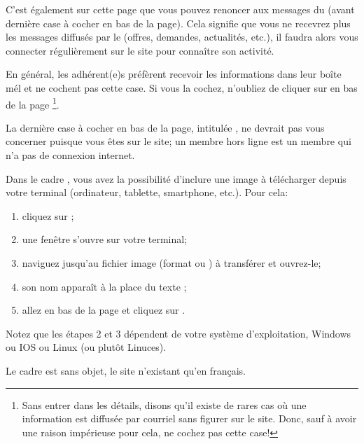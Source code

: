 C’est également sur cette page que vous pouvez renoncer aux messages du \CdS{} (avant dernière case à cocher en bas de la page). Cela signifie que vous ne recevrez plus les messages diffusés par le \sel{} (offres, demandes, actualités, etc.), il faudra alors vous connecter régulièrement sur le site pour connaître son activité.

En général, les adhérent(e)s préfèrent recevoir les informations dans leur boîte mél et ne cochent pas cette case. Si vous la cochez, n'oubliez de cliquer sur  en bas de la page%
\footnote{Sans entrer dans les détails, disons qu'il existe de rares cas où une information est diffusée par courriel sans figurer sur le site. Donc, sauf à avoir une raison impérieuse pour cela, ne cochez pas cette case!}.


La dernière case à cocher en bas de la page, intitulée , ne devrait pas vous concerner puisque vous êtes sur le site; un membre hors ligne est un membre qui n'a pas de connexion internet.

\label{sec:insererImage}

Dans le cadre , vous avez la possibilité d’inclure une image à télécharger depuis votre terminal (ordinateur, tablette, smartphone, etc.). Pour cela:
\begin{enumerate}
    \item cliquez sur ;
    \item une fenêtre s’ouvre sur votre terminal;
    \item naviguez jusqu’au fichier image (format  ou ) à transférer et ouvrez-le;
    \item son nom apparaît à la place du texte ;
    \item allez en bas de la page et cliquez sur .
\end{enumerate}
Notez que les étapes 2 et 3 dépendent de votre système d’exploitation, Windows ou IOS ou Linux (ou plutôt Linuces).


Le cadre  est sans objet, le site n’existant qu’en français.

